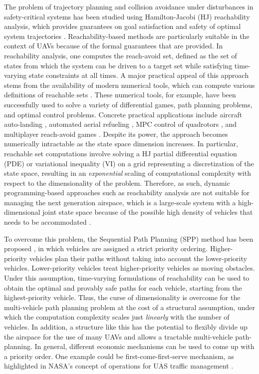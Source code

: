 The problem of trajectory planning and collision avoidance under disturbances in safety-critical systems has been studied using Hamilton-Jacobi (HJ) reachability analysis, which provides guarantees on goal satisfaction and safety of optimal system trajectories \cite{Barron90, Mitchell05, Bokanowski10, Bokanowski11, Margellos11, Fisac15}. Reachability-based methods are particularly suitable in the context of UAVs because of the formal guarantees that are provided. In reachability analysis, one computes the reach-avoid set, defined as the set of states from which the system can be driven to a target set while satisfying time-varying state constraints at all times. A major practical appeal of this approach stems from the availability of modern numerical tools, which can compute various definitions of reachable sets \cite{Sethian96, Osher02, Mitchell02, Mitchell07b}. These numerical tools, for example, have been successfully used to solve a variety of differential games, path planning problems, and optimal control problems. Concrete practical applications include aircraft auto-landing \cite{Bayen07}, automated aerial refueling \cite{Ding08}, MPC control of quadrotors \cite{Bouffard12}, and multiplayer reach-avoid games \cite{Huang11}. Despite its power, the approach becomes numerically intractable as the state space dimension increases. In particular, reachable set computations involve solving a HJ partial differential equation (PDE) or variational inequality (VI) on a grid representing a discretization of the state space, resulting in an \textit{exponential} scaling of computational complexity with respect to the dimensionality of the problem. Therefore, as such, dynamic programming-based approaches such as reachability analysis are not suitable for managing the next generation airspace, which is a large-scale system with a high-dimensional joint state space because of the possible high density of vehicles that needs to be accommodated \cite{Kopardekar16}.  

To overcome this problem, the Sequential Path Planning (SPP) method has been proposed \cite{Chen15c}, in which vehicles are assigned a strict priority ordering. Higher-priority vehicles plan their paths without taking into account the lower-priority vehicles. Lower-priority vehicles treat higher-priority vehicles as moving obstacles. Under this assumption, time-varying formulations of reachability \cite{Bokanowski11, Fisac15} can be used to obtain the optimal and provably safe paths for each vehicle, starting from the highest-priority vehicle. Thus, the curse of dimensionality is overcome for the multi-vehicle path planning problem at the cost of a structural assumption, under which the computation complexity scales just \textit{linearly} with the number of vehicles. In addition, a structure like this has the potential to flexibly divide up the airspace for the use of many UAVs and allows a tractable multi-vehicle path-planning. In general, different economic mechanisms can be used to come up with a priority order. One example could be first-come-first-serve mechanism, as highlighted in NASA’s concept of operations for UAS traffic management \cite{Kopardekar16}. 

